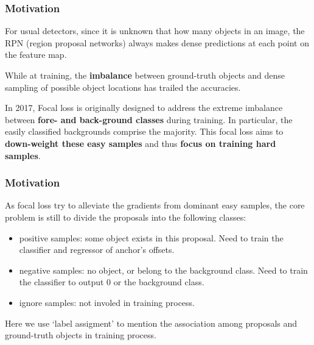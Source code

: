 \documentclass[slidetop, mathserif, dvipsnames]{beamer}
\begin{document}
\begin{frame}
    \frametitle{Motivation}

    For usual detectors, since it is unknown that how many objects in an image,
    the RPN (region proposal networks) always makes dense predictions at each
    point on the feature map.

    \quad

    While at training, the {\bf imbalance} between ground-truth objects and dense
    sampling of possible object locations has trailed the accuracies.

    \quad

    In 2017, Focal loss is originally designed to address the extreme imbalance between
    {\bf fore- and back-ground classes} during training.
    In particular, the easily classified backgrounds comprise the majority.
    This focal loss aims to 
    {\bf down-weight these easy samples} and thus
    {\bf focus on training hard samples}.
\end{frame}

\begin{frame}
    \frametitle{Motivation}

    As focal loss try to alleviate the gradients from dominant easy samples,
    the core problem is still to divide the proposals into the following
    classes:
    \begin{itemize}
        \item positive samples: some object exists in this proposal.
            Need to train the classifier and regressor of anchor's offsets.
        \item negative samples: no object, or belong to the background class.
            Need to train the classifier to output 0 or the background class.
        \item ignore samples: not involed in training process.
    \end{itemize}

    Here we use `label assigment' to mention the association among
    proposals and ground-truth objects in training process.
\end{frame}
\end{document}
